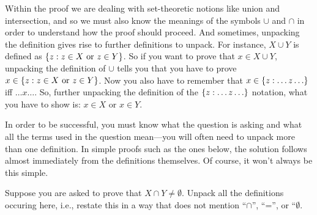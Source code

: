 \documentclass[../../../include/open-logic-section]{subfiles}
\begin{document}
Within the proof we are dealing with set-theoretic notions like union
and intersection, and so we must also know the meanings of the symbols
$\cup$ and $\cap$ in order to understand how the proof should
proceed. And sometimes, unpacking the definition gives rise to further
definitions to unpack. For instance, $X \cup Y$ is defined as
$\{ z : z \in X \text{ or } z \in Y \}$. So if you want to prove
that $x \in X \cup Y$, unpacking the definition of $\cup$ tells you
that you have to prove $x \in \{ z : z \in X \text{ or } z \in
  Y \}$.  Now you also have to remember that $x \in \Setabs{z}{\dots
  z\dots}$ iff $\dots x\dots$.  So, further unpacking the definition
of the $\Setabs{z}{\dots z \dots}$ notation, what you have to show is:
$x \in X$ or $x \in Y$.

In order to be successful, you must know what the question is asking
and what all the terms used in the question mean---you will often need
to unpack more than one definition.  In simple proofs such as the ones
below, the solution follows almost immediately from the definitions
themselves. Of course, it won't always be this simple.

\begin{prob}
Suppose you are asked to prove that $X \cap Y \neq \emptyset$. Unpack
all the definitions occuring here, i.e., restate this in a way that
does not mention ``$\cap$'', ``='', or ``$\emptyset$.
\end{prob}
\end{document}
